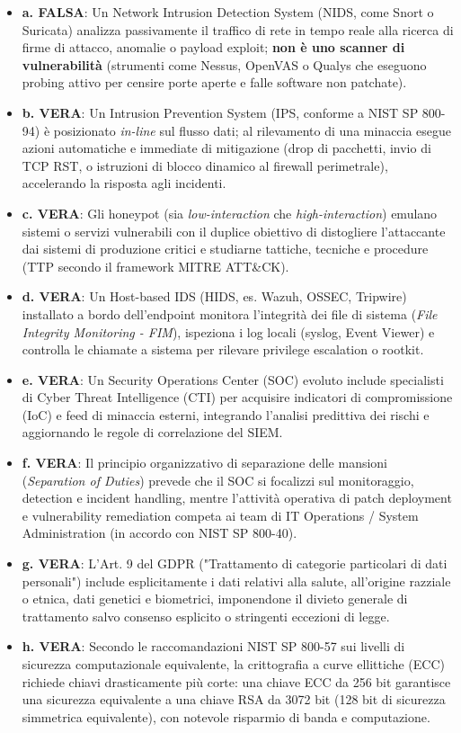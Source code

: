 \documentclass[11pt,a4paper]{article}
\begin{document}
\begin{solutionbox}
\begin{itemize}
    \item \textbf{a. FALSA}: Un Network Intrusion Detection System (NIDS, come Snort o Suricata) analizza passivamente il traffico di rete in tempo reale alla ricerca di firme di attacco, anomalie o payload exploit; \textbf{non \`e uno scanner di vulnerabilit\`a} (strumenti come Nessus, OpenVAS o Qualys che eseguono probing attivo per censire porte aperte e falle software non patchate).
    \item \textbf{b. VERA}: Un Intrusion Prevention System (IPS, conforme a NIST SP 800-94) \`e posizionato \textit{in-line} sul flusso dati; al rilevamento di una minaccia esegue azioni automatiche e immediate di mitigazione (drop di pacchetti, invio di TCP RST, o istruzioni di blocco dinamico al firewall perimetrale), accelerando la risposta agli incidenti.
    \item \textbf{c. VERA}: Gli honeypot (sia \textit{low-interaction} che \textit{high-interaction}) emulano sistemi o servizi vulnerabili con il duplice obiettivo di distogliere l'attaccante dai sistemi di produzione critici e studiarne tattiche, tecniche e procedure (TTP secondo il framework MITRE ATT\&CK).
    \item \textbf{d. VERA}: Un Host-based IDS (HIDS, es. Wazuh, OSSEC, Tripwire) installato a bordo dell'endpoint monitora l'integrit\`a dei file di sistema (\textit{File Integrity Monitoring - FIM}), ispeziona i log locali (syslog, Event Viewer) e controlla le chiamate a sistema per rilevare privilege escalation o rootkit.
    \item \textbf{e. VERA}: Un Security Operations Center (SOC) evoluto include specialisti di Cyber Threat Intelligence (CTI) per acquisire indicatori di compromissione (IoC) e feed di minaccia esterni, integrando l'analisi predittiva dei rischi e aggiornando le regole di correlazione del SIEM.
    \item \textbf{f. VERA}: Il principio organizzativo di separazione delle mansioni (\textit{Separation of Duties}) prevede che il SOC si focalizzi sul monitoraggio, detection e incident handling, mentre l'attivit\`a operativa di patch deployment e vulnerability remediation competa ai team di IT Operations / System Administration (in accordo con NIST SP 800-40).
    \item \textbf{g. VERA}: L'Art. 9 del GDPR ("Trattamento di categorie particolari di dati personali") include esplicitamente i dati relativi alla salute, all'origine razziale o etnica, dati genetici e biometrici, imponendone il divieto generale di trattamento salvo consenso esplicito o stringenti eccezioni di legge.
    \item \textbf{h. VERA}: Secondo le raccomandazioni NIST SP 800-57 sui livelli di sicurezza computazionale equivalente, la crittografia a curve ellittiche (ECC) richiede chiavi drasticamente pi\`u corte: una chiave ECC da 256 bit garantisce una sicurezza equivalente a una chiave RSA da 3072 bit (128 bit di sicurezza simmetrica equivalente), con notevole risparmio di banda e computazione.
\end{itemize}
\end{solutionbox}
\end{document}
